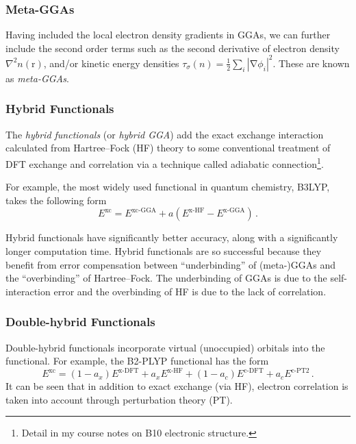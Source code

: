 \documentclass{article}
\theoremstyle{plain}\theoremheaderfont{\normalfont\itshape}\theorembodyfont{\rmfamily}\theoremseparator{.}\newtheorem*{rem}{Remark}\newtheorem*{ex}{Example}\newtheorem*{proof}{Proof}\newtheorem*{altp}{Alternative proof}
\theoremstyle{plain}\theoremheaderfont{\normalfont\bfseries}\theorembodyfont{\rmfamily}\theoremseparator{.}\newtheorem{thm}{Theorem}[section]\newtheorem{lem}[thm]{Lemma}\newtheorem{prop}[thm]{Proposition}\newtheorem*{cor}{Corollary}\newtheorem{defn}[thm]{Definition}\newtheorem{clm}[thm]{Claim}\newtheorem{clminproof}{Claim}\newtheorem{pos}{Postulate}[section]
\theoremstyle{break}\theoremheaderfont{\normalfont\itshape}\theorembodyfont{\rmfamily}\theoremseparator{.\medskip}\newtheorem*{proofskip}{Proof}\newtheorem*{exs}{Examples}\newtheorem*{rems}{Remarks}
\theoremstyle{break}\theoremheaderfont{\normalfont\bfseries}\theorembodyfont{\rmfamily}\theoremseparator{.\medskip}\newtheorem{lemskip}[thm]{Lemma}\newtheorem{defnskip}[thm]{Definition}\newtheorem{propskip}[thm]{Proposition}\newtheorem{thmskip}[thm]{Theorem}
\numberwithin{equation}{section}
\newcommand{\vb}[1]{\bm{\mathrm{#1}}}
\newcommand{\abs}[1]{\left| #1 \right|}
\newcommand{\grad}{\vb{\nabla}}
\newcommand{\laplacian}{\nabla^2}
\begin{document}
    \subsubsection{Meta-GGAs}
    Having included the local electron density gradients in GGAs, we can further include the second order terms such as the second derivative of electron density \(\laplacian n(\vb{r})\), and/or kinetic energy densities \(\tau_\sigma(n)=\frac{1}{2}\sum_i\abs{\grad\phi_i}^2\). These are known as \textit{meta-GGAs}.

    \subsubsection{Hybrid Functionals}
    The \textit{hybrid functionals} (or \textit{hybrid GGA}) add the exact exchange interaction calculated from Hartree--Fock (HF) theory to some conventional treatment of DFT exchange and correlation via a technique called adiabatic connection\footnote{Detail in my course notes on B10 electronic structure.}.

    For example, the most widely used functional in quantum chemistry, B3LYP, takes the following form
    \begin{equation}
        E^{\text{xc}}=E^{\text{xc-GGA}}+a(E^{\text{x-HF}}-E^{\text{x-GGA}})\,.
    \end{equation}

    Hybrid functionals have significantly better accuracy, along with a significantly longer computation time. Hybrid functionals are so successful because they benefit from error compensation between ``underbinding'' of (meta-)GGAs and the ``overbinding'' of Hartree--Fock. The underbinding of GGAs is due to the self-interaction error and the overbinding of HF is due to the lack of correlation.

    \subsubsection{Double-hybrid Functionals}
    Double-hybrid functionals incorporate virtual (unoccupied) orbitals into the functional. For example, the B2-PLYP functional has the form
    \begin{equation}
        E^{\text{xc}}=(1-a_x)E^{\text{x-DFT}}+a_x E^{\text{x-HF}}+(1-a_c)E^{\text{c-DFT}}+a_c E^{\text{c-PT2}}\,.
    \end{equation}
    It can be seen that in addition to exact exchange (via HF), electron correlation is taken into account through perturbation theory (PT).
\end{document}
